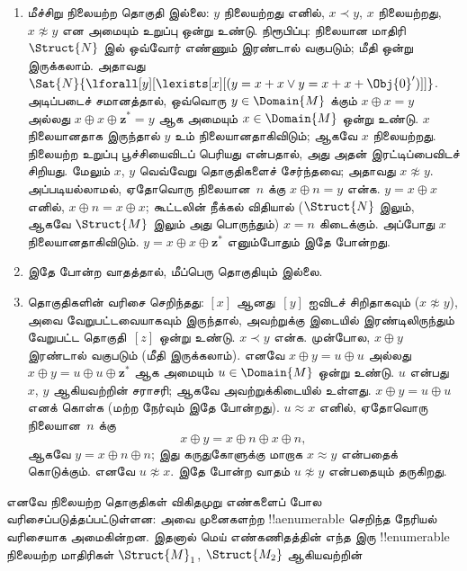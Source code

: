 \documentclass[11pt,a4paper,openany]{memoir}
\begin{document}
\begin{enumerate}
\item மீச்சிறு நிலையற்ற தொகுதி இல்லை:
  $y$ நிலையற்றது எனில், $x \prec y$,
  $x$ நிலையற்றது, $x \not\approx y$
  என அமையும் உறுப்பு ஒன்று உண்டு.
  நிரூபிப்பு: நிலையான மாதிரி~$\Struct{N}$ இல்
  ஒவ்வோர் எண்ணும் இரண்டால் வகுபடும்; மீதி ஒன்று
  இருக்கலாம். அதாவது
  $\Sat{N}{\lforall[y][\lexists[x][(y = x + x \lor y = x + x +
        \Obj{0}')]]}$.
  அடிப்படைச் சமானத்தால், ஒவ்வொரு
  $y \in \Domain{M}$ க்கும்
  $x \oplus x = y$ அல்லது
  $x \oplus x \oplus \mathbf{z}^*= y$
  ஆக அமையும் $x \in \Domain{M}$ ஒன்று உண்டு.
  $x$ நிலையானதாக இருந்தால் $y$ உம்
  நிலையானதாகிவிடும்; ஆகவே $x$ நிலையற்றது.
  நிலையற்ற உறுப்பு பூச்சியைவிடப் பெரியது
  என்பதால், அது அதன் இரட்டிப்பைவிடச் சிறியது.
  மேலும் $x$, $y$ வெவ்வேறு தொகுதிகளைச்
  சேர்ந்தவை; அதாவது $x \not\approx y$.
  அப்படியல்லாமல், ஏதோவொரு நிலையான~$n$
  க்கு $x \oplus n = y$ என்க.
  $y = x \oplus x$ எனில்,
  $x \oplus n = x \oplus x$;
  கூட்டலின் நீக்கல் விதியால்
  ($\Struct{N}$ இலும், ஆகவே $\Struct{M}$
  இலும் அது பொருந்தும்) $x = n$ கிடைக்கும்.
  அப்போது $x$ நிலையானதாகிவிடும்.
  $y = x \oplus x \oplus \mathbf{z}^*$
  எனும்போதும் இதே போன்றது.
\item இதே போன்ற வாதத்தால், மீப்பெரு தொகுதியும் இல்லை.
\item தொகுதிகளின் வரிசை செறிந்தது:
  $[x]$ ஆனது~$[y]$ ஐவிடச் சிறிதாகவும்
  ($x \not\approx y$), அவை வேறுபட்டவையாகவும்
  இருந்தால், அவற்றுக்கு இடையில் இரண்டிலிருந்தும்
  வேறுபட்ட தொகுதி~$[z]$ ஒன்று உண்டு.
  $x \prec y$ என்க. முன்போல,
  $x \oplus y$ இரண்டால் வகுபடும்
  (மீதி இருக்கலாம்). எனவே
  $x \oplus y = u \oplus u$ அல்லது
  $x \oplus y = u \oplus u \oplus \mathbf{z}^*$
  ஆக அமையும் $u
  \in \Domain{M}$ ஒன்று உண்டு.
  $u$ என்பது $x$, $y$ ஆகியவற்றின்
  சராசரி; ஆகவே அவற்றுக்கிடையில் உள்ளது.
  $x \oplus y = u \oplus u$ எனக் கொள்க
  (மற்ற நேர்வும் இதே போன்றது).
  $u \approx x$ எனில், ஏதோவொரு
  நிலையான~$n$ க்கு
  \[
  x \oplus y = x \oplus n \oplus x \oplus n,
  \]
  ஆகவே $y = x \oplus n \oplus n$;
  இது கருதுகோளுக்கு மாறாக $x \approx y$
  என்பதைக் கொடுக்கும். எனவே
  $u \not\approx x$. இதே போன்ற வாதம்
  $u \not\approx y$ என்பதையும் தருகிறது.
\end{enumerate}
எனவே நிலையற்ற தொகுதிகள் விகிதமுறு எண்களைப்
போல வரிசைப்படுத்தப்பட்டுள்ளன: அவை முனைகளற்ற
!!a{enumerable} செறிந்த நேரியல் வரிசையாக அமைகின்றன.
இதனால் மெய் எண்கணிதத்தின் எந்த இரு
!!{enumerable} நிலையற்ற மாதிரிகள்
$\Struct{M}_1$, $\Struct{M_2}$ ஆகியவற்றின்
\end{document}
